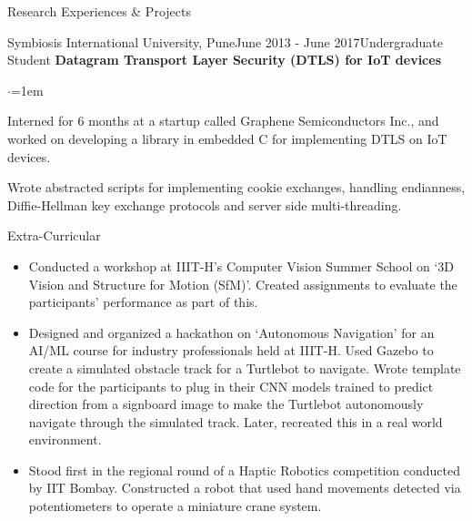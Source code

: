 \documentclass{resume} %
\begin{document}
\begin{rSection}{Research Experiences \& Projects}
\begin{rSubsection}{Symbiosis International University, Pune}{June 2013 - June 2017}{Undergraduate Student}{}
{\textbullet \hspace{0.1em} \textbf{Datagram Transport Layer Security (DTLS) for IoT devices}}

\vspace*{-0.2em}
\begin{list}{$\cdot$}{\leftmargin=1em} %
\item Interned for 6 months at a startup called Graphene Semiconductors Inc., and worked on developing a library in embedded C for implementing DTLS on IoT devices.
\item Wrote abstracted scripts for implementing cookie exchanges, handling endianness, Diffie-Hellman key exchange protocols and server side multi-threading.
\end{list}
\end{rSubsection}
\end{rSection}

\begin{rSection}{Extra-Curricular}
\begin{itemize}
    \item Conducted a workshop at IIIT-H's Computer Vision Summer School on `3D Vision and Structure for Motion (SfM)'. Created assignments to evaluate the participants' performance as part of this.
    \item Designed and organized a hackathon on `Autonomous Navigation' for an AI/ML course for industry professionals held at IIIT-H. Used Gazebo to create a simulated obstacle track for a Turtlebot to navigate. Wrote template code for the participants to plug in their CNN models trained to predict direction from a signboard image to make the Turtlebot autonomously navigate through the simulated track. Later, recreated this in a real world environment.
    \item Stood first in the regional round of a Haptic Robotics competition conducted by IIT Bombay. Constructed a robot that used hand movements detected via potentiometers to operate a miniature crane system.
\end{itemize}
\end{rSection}
\end{document}
